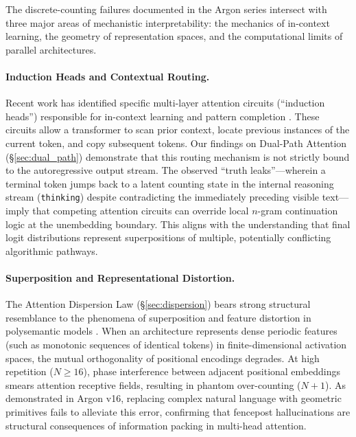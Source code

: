 \documentclass[11pt,a4paper]{article}
\begin{document}
The discrete-counting failures documented in the Argon series intersect with three major areas of mechanistic interpretability: the mechanics of in-context learning, the geometry of representation spaces, and the computational limits of parallel architectures.

\paragraph{Induction Heads and Contextual Routing.} Recent work has identified specific multi-layer attention circuits (``induction heads'') responsible for in-context learning and pattern completion \cite{olsson2022incontext}. These circuits allow a transformer to scan prior context, locate previous instances of the current token, and copy subsequent tokens. Our findings on Dual-Path Attention (\S\ref{sec:dual_path}) demonstrate that this routing mechanism is not strictly bound to the autoregressive output stream. The observed ``truth leaks''---wherein a terminal token jumps back to a latent counting state in the internal reasoning stream (\texttt{thinking}) despite contradicting the immediately preceding visible text---imply that competing attention circuits can override local $n$-gram continuation logic at the unembedding boundary. This aligns with the understanding that final logit distributions represent superpositions of multiple, potentially conflicting algorithmic pathways.

\paragraph{Superposition and Representational Distortion.} The Attention Dispersion Law (\S\ref{sec:dispersion}) bears strong structural resemblance to the phenomena of superposition and feature distortion in polysemantic models \cite{elhage2022toy, cammarata2020circuits}. When an architecture represents dense periodic features (such as monotonic sequences of identical tokens) in finite-dimensional activation spaces, the mutual orthogonality of positional encodings degrades. At high repetition ($N \ge 16$), phase interference between adjacent positional embeddings smears attention receptive fields, resulting in phantom over-counting ($N+1$). As demonstrated in Argon v16, replacing complex natural language with geometric primitives fails to alleviate this error, confirming that fencepost hallucinations are structural consequences of information packing in multi-head attention.
\end{document}
